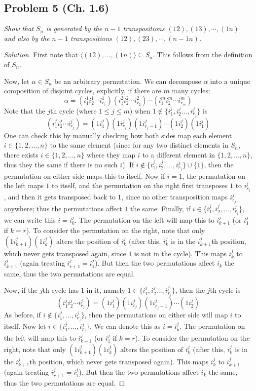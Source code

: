 \documentclass{article}
\begin{document}
\subsection*{Problem 5 (Ch. 1.6)}
{\it Show that $S_n$ is generated by the $n-1$ transpositions
$(12), (13), \cdots, (1n)$ and also by the $n-1$ transpositions
$(12),(23),\cdots,(n-1n)$.}
\begin{proof}[Solution]\let\qed\relax
	First note that $\langle(12),\dots,(1n)\rangle \subseteq S_n$.
	This follows from the definition of $S_n$.

	Now, let $\alpha \in S_n$ be an arbitrary permutation.
\iffalse
	We can decompose $\alpha$ into a unique composition of disjoint cycles,
	explicitly, if there are $m$ many cycles:
	\[
		\alpha = (i_1^1 i_2^1 \cdots i_{r_1}^1)(i_1^2 i_2^2 \cdots i_{r_2}^2)
		\cdots (i_1^m i_2^m \cdots i_{r_m}^m)
	\]
	Note that the $j$th cycle (where $1 \leq j \leq m$) when $1 \not\in \{i_1^j,i_2^j\dots,i_{r_j}^j\}$ is
	\[
		(i_1^j i_2^j \cdots i_{r_j}^j) = (1 i_1^j)(1 i_{r_j}^j) (1 i_{r_j-1}^j) \cdots(1 i_2^j) (1 i_1^j)
	\]
	One can check this by manually checking how both sides map each element $i \in \{1,2,\dots,n\}$
	to the same element
	(since for any two distinct elements in $S_n$,
	there exists $i\in \{1,2,\dots,n\}$ where they
	map $i$ to a different element in $\{1,2,\dots,n\}$,
	thus they the same if there is no such $i$).
	If $i \not\in \{i_1^{j},i_2^{j},\dots,i_{r_j}^j\} \cup \{1\}$,
	then the permutation on either side maps this to itself.
	Now if $i = 1$,
	the permutation on the left maps $1$ to itself,
	and the permutation on the right first transposes $1$ to $i^j_{r_j}$,
	and then it gets transposed back to $1$,
	since no other transposition maps $i^j_{r_j}$ anywhere;
	thus the permutations affect $1$ the same.
	Finally, if $i \in \{i_1^{j},i_2^{j},\dots,i_{r_j}^j\}$,
	we can write this $i = i_k^j$.
	The permutation on the left will map this to $i_{k+1}^j$ (or $i_1^j$ if $k=r$).
	To consider the permutation on the right,
	note that only $(1i^j_{k+1})(1i^j_k)$ alters the position of $i^j_k$
	(after this, $i^j_k$ is in the $i^j_{k+1}$th position,
	which never gets transposed again,
	since $1$ is not in the cycle).
	This maps $i^j_k$ to $i^j_{k+1}$
	(again treating $i^j_{r+1} = i^j_1$).
	But then the two permutations affect $i_k$ the same,
	thus the two permutations are equal.

	Now, if the $j$th cycle has $1$ in it, namely $1 \in \{i_1^j,i_2^j\dots,i_{r_j}^j\}$,
	then the $j$th cycle is
	\[
		(i_1^j i_2^j \cdots i_{r_j}^j) = (1 i_1^j)(1 i_{r_j}^j) (1 i_{r_j-1}^j) \cdots(1 i_2^j)
	\]
	As before, if $i \not\in \{i_1^j,\dots,i_{r_j}^j\}$,
	then the permutations on either side will map $i$ to itself.
	Now let $i \in \{i_1^j,\dots,i_{r_j}^j\}$.
	We can denote this as $i = i_k^j$.
	The permutation on the left will map this to $i_{k+1}^j$ (or $i_1^j$ if $k=r$).
	To consider the permutation on the right,
	note that only $(1i^j_{k+1})(1i^j_k)$ alters the position of $i^j_k$
	(after this, $i^j_k$ is in the $i^j_{k+1}$th position,
	which never gets transposed again).
	This maps $i^j_k$ to $i^j_{k+1}$
	(again treating $i^j_{r+1} = i^j_1$).
	But then the two permutations affect $i_k$ the same,
	thus the two permutations are equal.


\end{proof}
\end{document}
